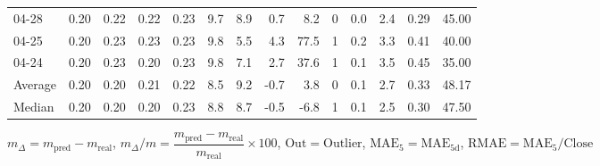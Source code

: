 \begin{threeparttable}
{\begin{tabular}{lrrrrrrrrrrrrr}
  04-28 &          0.20 &          0.22 &          0.22 &        0.23 &                 9.7 &                 8.9 &        0.7 &          8.2 &              0 &                 0.0 &              2.4 &            0.29 &                  45.00 \\
  04-25 &          0.20 &          0.23 &          0.23 &        0.23 &                 9.8 &                 5.5 &        4.3 &         77.5 &              1 &                 0.2 &              3.3 &            0.41 &                  40.00 \\
  04-24 &          0.20 &          0.23 &          0.20 &        0.23 &                 9.8 &                 7.1 &        2.7 &         37.6 &              1 &                 0.1 &              3.5 &            0.45 &                  35.00 \\
Average &          0.20 &          0.20 &          0.21 &        0.22 &                 8.5 &                 9.2 &       -0.7 &          3.8 &              0 &                 0.1 &              2.7 &            0.33 &                  48.17 \\
 Median &          0.20 &          0.20 &          0.20 &        0.23 &                 8.8 &                 8.7 &       -0.5 &         -6.8 &              1 &                 0.1 &              2.5 &            0.30 &                  47.50 \\
\bottomrule
\end{tabular}
}
\begin{tablenotes}\footnotesize
\item $m_\Delta=m_{\text{pred}}-m_{\text{real}}$,
$m_\Delta/m=\dfrac{m_{\text{pred}}-m_{\text{real}}}{m_{\text{real}}}\times100$,
$\mathrm{Out}=\text{Outlier}$,
$\mathrm{MAE}_5=\mathrm{MAE}_{5\text{d}}$,
$\mathrm{RMAE}=\mathrm{MAE}_5/\text{Close}$
\end{tablenotes}
\end{threeparttable}
\endgroup

